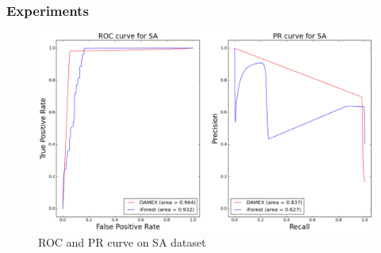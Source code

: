 \documentclass[9pt]{beamer}
\begin{document}
\begin{frame}
\frametitle{Experiments}
\begin{figure}[H]
  \centering
  \includegraphics[width = 1. \textwidth]{SA-lb-semi-supervised-average-0001.pdf}
  \caption{ROC and PR curve on SA dataset}
  \label{SA}
\end{figure}
\end{frame}
\end{document}
